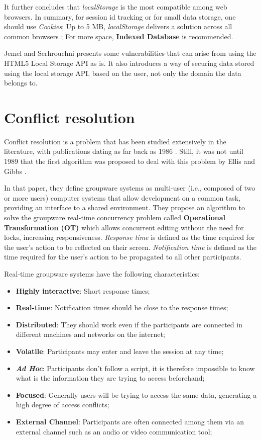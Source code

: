 It further concludes that \textit{localStorage} is the most compatible among web browsers. In summary, for session id tracking or for small data storage, one should use \textit{Cookies}; Up to 5 MB, \textit{localStorage} delivers a solution across all common browsers \cite{webstorage-w3c}; For more space, \textbf{Indexed Database} is recommended.

Jemel and Serhrouchni \cite{Jemel2014} presents some vulnerabilities that can arise from using the HTML5 Local Storage API as is. It also introduces a way of securing data stored using the local storage API, based on the user, not only the domain the data belongs to.


\section{Conflict resolution}\label{sec:conflict-res-sota}

Conflict resolution is a problem that has been studied extensively in the literature, with publications dating as far back as 1986 \cite{Greif1986}. Still, it was not until 1989 that the first algorithm was proposed to deal with this problem by Ellis and Gibbs \cite{Ellis1989}.

In that paper, they define groupware systems as multi-user (i.e., composed of two or more users) computer systems that allow development on a common task, providing an interface to a shared environment. They propose an algorithm to solve the groupware real-time concurrency problem called \textbf{Operational Transformation (OT)} which allows concurrent editing without the need for locks, increasing responsiveness. \textit{Response time} is defined as the time required for the user's action to be reflected on their screen. \textit{Notification time} is defined as the time required for the user's action to be propagated to all other participants.

Real-time groupware systems have the following characteristics:

\begin{itemize}
    \item \textbf{Highly interactive}: Short response times;
    \item \textbf{Real-time}: Notification times should be close to the response times;
    \item \textbf{Distributed}: They should work even if the participants are connected in different machines and networks on the internet;
    \item \textbf{Volatile}: Participants may enter and leave the session at any time;
    \item \textbf{\textit{Ad Hoc}}: Participants don't follow a script, it is therefore impossible to know what is the information they are trying to access beforehand;
    \item \textbf{Focused}: Generally users will be trying to access the same data, generating a high degree of access conflicts;
    \item \textbf{External Channel}: Participants are often connected among them via an external channel such as an audio or video communication tool;
\end{itemize}

